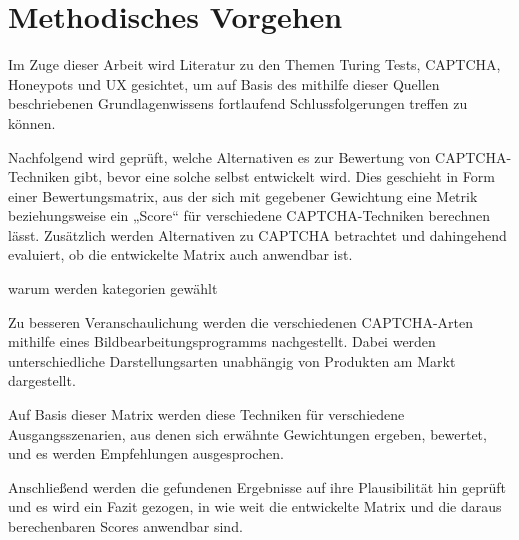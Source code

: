 \chapter{Methodisches Vorgehen}
Im Zuge dieser Arbeit wird Literatur zu den Themen Turing Tests, CAPTCHA, Honeypots und UX gesichtet, 
um auf Basis des mithilfe dieser Quellen beschriebenen Grundlagenwissens fortlaufend Schlussfolgerungen treffen zu können. 

Nachfolgend wird geprüft, welche Alternativen es zur Bewertung von CAPTCHA-Techniken gibt, bevor eine solche selbst entwickelt wird. 
Dies geschieht in Form einer Bewertungsmatrix, aus der sich mit gegebener Gewichtung eine Metrik beziehungsweise ein „Score“ für verschiedene CAPTCHA-Techniken berechnen lässt. 
Zusätzlich werden Alternativen zu CAPTCHA betrachtet und dahingehend evaluiert, ob die entwickelte Matrix auch anwendbar ist.

warum  werden kategorien gewählt

Zu besseren Veranschaulichung werden die verschiedenen CAPTCHA-Arten mithilfe eines Bildbearbeitungsprogramms nachgestellt. 
Dabei werden unterschiedliche Darstellungsarten unabhängig von Produkten am Markt dargestellt.

Auf Basis dieser Matrix werden diese Techniken für verschiedene Ausgangsszenarien, 
aus denen sich erwähnte Gewichtungen ergeben, bewertet, und es werden Empfehlungen ausgesprochen.

Anschließend werden die gefundenen Ergebnisse auf ihre Plausibilität hin geprüft und es wird ein Fazit gezogen, 
in wie weit die entwickelte Matrix und die daraus berechenbaren Scores anwendbar sind.
  
